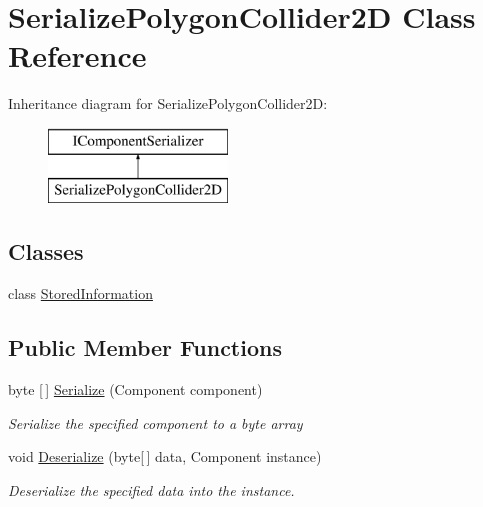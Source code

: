 \hypertarget{class_serialize_polygon_collider2_d}{}\section{Serialize\+Polygon\+Collider2D Class Reference}
\label{class_serialize_polygon_collider2_d}
Inheritance diagram for Serialize\+Polygon\+Collider2D\+:\begin{figure}[H]
\begin{center}
\leavevmode
\includegraphics[height=2.000000cm]{class_serialize_polygon_collider2_d}
\end{center}
\end{figure}
\subsection*{Classes}
\begin{DoxyCompactItemize}
\item 
class \hyperlink{class_serialize_polygon_collider2_d_1_1_stored_information}{Stored\+Information}
\end{DoxyCompactItemize}
\subsection*{Public Member Functions}
\begin{DoxyCompactItemize}
\item 
byte \mbox{[}$\,$\mbox{]} \hyperlink{class_serialize_polygon_collider2_d_a0f488a1150cc7f8786e659577a4d9488}{Serialize} (Component component)
\begin{DoxyCompactList}\small\item\em Serialize the specified component to a byte array \end{DoxyCompactList}\item 
void \hyperlink{class_serialize_polygon_collider2_d_a91694bef6812922cf021805d76b9d7e4}{Deserialize} (byte\mbox{[}$\,$\mbox{]} data, Component instance)
\begin{DoxyCompactList}\small\item\em Deserialize the specified data into the instance. \end{DoxyCompactList}\end{DoxyCompactItemize}


